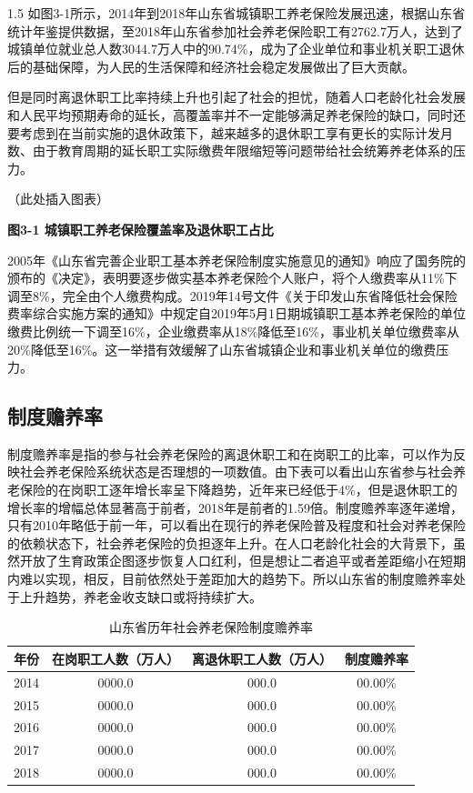 \documentclass[a4paper,12pt]{ctexart}
\newcommand{\wuhao}{\fontsize{10.5pt}{15.75pt}\selectfont}
\numberwithin{equation}{section}
\begin{document}
\begin{spacing}{1.5}
如图3-1所示，2014年到2018年山东省城镇职工养老保险发展迅速，根据山东省统计年鉴提供数据，至2018年山东省参加社会养老保险职工有2762.7万人，达到了城镇单位就业总人数3044.7万人中的90.74\%，成为了企业单位和事业机关职工退休后的基础保障，为人民的生活保障和经济社会稳定发展做出了巨大贡献。

但是同时离退休职工比率持续上升也引起了社会的担忧，随着人口老龄化社会发展和人民平均预期寿命的延长，高覆盖率并不一定能够满足养老保险的缺口，同时还要考虑到在当前实施的退休政策下，越来越多的退休职工享有更长的实际计发月数、由于教育周期的延长职工实际缴费年限缩短等问题带给社会统筹养老体系的压力。

\vspace{0.5cm}
\begin{center}
  （此处插入图表）
\end{center}
\begin{center}
  \textbf{\wuhao 图3-1 城镇职工养老保险覆盖率及退休职工占比}
\end{center}
\vspace{0.5cm}

2005年《山东省完善企业职工基本养老保险制度实施意见的通知》响应了国务院的颁布的《决定》，表明要逐步做实基本养老保险个人账户，将个人缴费率从11\%下调至8\%，完全由个人缴费构成。2019年14号文件《关于印发山东省降低社会保险费率综合实施方案的通知》中规定自2019年5月1日期城镇职工基本养老保险的单位缴费比例统一下调至16\%，企业缴费率从18\%降低至16\%，事业机关单位缴费率从20\%降低至16\%。这一举措有效缓解了山东省城镇企业和事业机关单位的缴费压力。

\subsection{制度赡养率}

制度赡养率是指的参与社会养老保险的离退休职工和在岗职工的比率，可以作为反映社会养老保险系统状态是否理想的一项数值。由下表可以看出山东省参与社会养老保险的在岗职工逐年增长率呈下降趋势，近年来已经低于4\%，但是退休职工的增长率的增幅总体显著高于前者，2018年是前者的1.59倍。制度赡养率逐年递增，只有2010年略低于前一年，可以看出在现行的养老保险普及程度和社会对养老保险的依赖状态下，社会养老保险的负担逐年上升。在人口老龄化社会的大背景下，虽然开放了生育政策企图逐步恢复人口红利，但是想让二者追平或者差距缩小在短期内难以实现，相反，目前依然处于差距加大的趋势下。所以山东省的制度赡养率处于上升趋势，养老金收支缺口或将持续扩大。

\vspace{0.3cm}
\begin{table}[htbp]
\centering
\caption{山东省历年社会养老保险制度赡养率}
\wuhao
\begin{tabular}{cccc}
\toprule
年份 & 在岗职工人数（万人） & 离退休职工人数（万人） & 制度赡养率 \\
\midrule
2014 & 0000.0 & 000.0 & 00.00\% \\
2015 & 0000.0 & 000.0 & 00.00\% \\
2016 & 0000.0 & 000.0 & 00.00\% \\
2017 & 0000.0 & 000.0 & 00.00\% \\
2018 & 0000.0 & 000.0 & 00.00\% \\
\bottomrule
\end{tabular}


\end{table}
\end{spacing}
\end{document}
